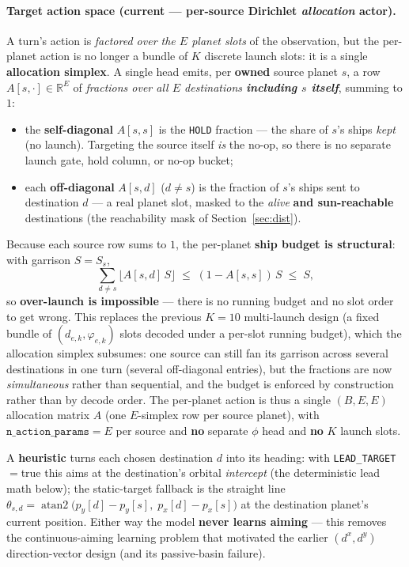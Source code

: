 \documentclass[11pt]{article}
\newcommand{\R}{\mathbb{R}}
\begin{document}
\paragraph{Target action space (current --- per-source Dirichlet \emph{allocation} actor).}
A turn's action is \emph{factored over the $E$ planet slots} of the observation, but the per-planet
action is no longer a bundle of $K$ discrete launch slots: it is a single \textbf{allocation
simplex}. A single head emits, per \textbf{owned} source planet $s$, a row $A[s,\cdot]\in\R^{E}$ of
\emph{fractions over all $E$ destinations \textbf{including $s$ itself}}, summing to $1$:
\begin{itemize}[nosep]
\item the \textbf{self-diagonal} $A[s,s]$ is the \texttt{HOLD} fraction --- the share of $s$'s ships
\emph{kept} (no launch). Targeting the source itself \emph{is} the no-op, so there is no separate
launch gate, hold column, or no-op bucket;
\item each \textbf{off-diagonal} $A[s,d]$ ($d\neq s$) is the fraction of $s$'s ships sent to
destination $d$ --- a real planet slot, masked to the \emph{alive} \textbf{and sun-reachable}
destinations (the reachability mask of Section~\ref{sec:dist}).
\end{itemize}
Because each source row sums to $1$, the per-planet \textbf{ship budget is structural}: with garrison
$S=S_s$,
\begin{equation}
\sum_{d\neq s}\big\lfloor A[s,d]\,S\big\rfloor \;\le\; (1-A[s,s])\,S \;\le\; S,
\end{equation}
so \textbf{over-launch is impossible} --- there is no running budget and no slot order to get wrong.
This replaces the previous $K{=}10$ multi-launch design (a fixed bundle of $(d_{e,k},\varphi_{e,k})$
slots decoded under a per-slot running budget), which the allocation simplex subsumes: one source can
still fan its garrison across several destinations in one turn (several off-diagonal entries), but the
fractions are now \emph{simultaneous} rather than sequential, and the budget is enforced by
construction rather than by decode order. The per-planet action is thus a single $(B,E,E)$ allocation
matrix $A$ (one $E$-simplex row per source planet), with $\texttt{n\_action\_params}=E$ per source
and \textbf{no} separate $\phi$ head and \textbf{no} $K$ launch slots.

A \textbf{heuristic} turns each chosen destination $d$ into its heading: with \texttt{LEAD\_TARGET}$=$true
this aims at the destination's orbital \emph{intercept} (the deterministic lead math below); the
static-target fallback is the straight line
$\theta_{s,d}=\operatorname{atan2}\big(p_y[d]-p_y[s],\;p_x[d]-p_x[s]\big)$ at the destination planet's
current position. Either way the model \textbf{never learns aiming} --- this removes the
continuous-aiming learning problem that motivated the earlier $(d^x,d^y)$ direction-vector design
(and its passive-basin failure).
\end{document}
